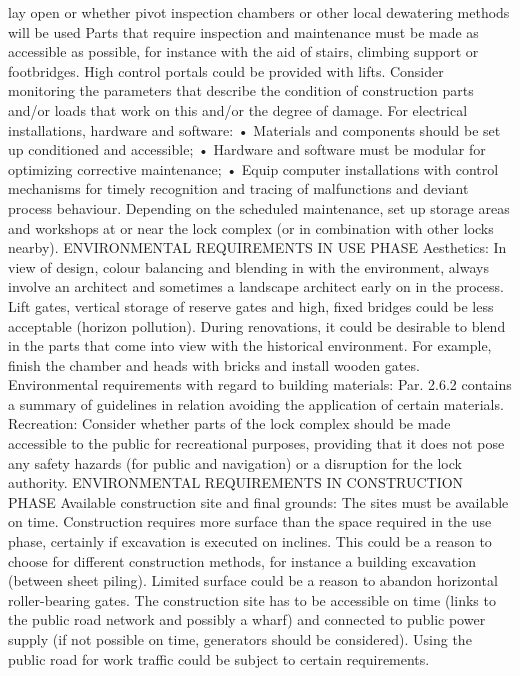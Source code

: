 lay open or whether pivot inspection chambers or other local dewatering
methods will be used
Parts that require inspection and maintenance must be made as
accessible as possible, for instance with the aid of stairs, climbing
support or footbridges. High control portals could be provided with
lifts.
Consider monitoring the parameters that describe the condition of
construction parts and/or loads that work on this and/or the degree
of damage.
For electrical installations, hardware and software:
• Materials and components should be set up conditioned and
accessible;
• Hardware and software must be modular for optimizing corrective
maintenance;
• Equip computer installations with control mechanisms for timely
recognition and tracing of malfunctions and deviant process
behaviour.
Depending on the scheduled maintenance, set up storage areas and
workshops at or near the lock complex (or in combination with
other locks nearby).
ENVIRONMENTAL REQUIREMENTS IN USE PHASE
Aesthetics:
In view of design, colour balancing and blending in with the environment,
always involve an architect and sometimes a landscape
architect early on in the process.
Lift gates, vertical storage of reserve gates and high, fixed bridges
could be less acceptable (horizon pollution).
During renovations, it could be desirable to blend in the parts that
come into view with the historical environment. For example, finish
the chamber and heads with bricks and install wooden gates.
Environmental requirements with regard to building materials:
Par. 2.6.2 contains a summary of guidelines in relation avoiding the
application of certain materials.
Recreation:
Consider whether parts of the lock complex should be made accessible
to the public for recreational purposes, providing that it does
not pose any safety hazards (for public and navigation) or a disruption
for the lock authority.
ENVIRONMENTAL REQUIREMENTS IN CONSTRUCTION
PHASE
Available construction site and final grounds:
The sites must be available on time. Construction requires more
surface than the space required in the use phase, certainly if excavation
is executed on inclines. This could be a reason to choose for
different construction methods, for instance a building excavation
(between sheet piling). Limited surface could be a reason to abandon
horizontal roller-bearing gates.
The construction site has to be accessible on time (links to the
public road network and possibly a wharf) and connected to public
power supply (if not possible on time, generators should be considered).
Using the public road for work traffic could be subject to
certain requirements.

